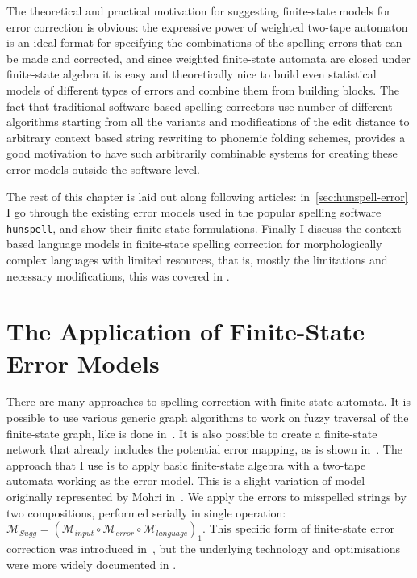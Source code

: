 \documentclass[officiallayout]{unihelcompling}
\begin{document}
The theoretical and practical motivation for suggesting finite-state models for
error correction is obvious: the expressive power of weighted two-tape 
automaton is an ideal format for specifying the combinations of the
spelling errors that can be made and corrected, and since weighted
finite-state automata are closed under finite-state algebra it is easy
and theoretically nice to build even statistical models of different types
of errors and combine them from building blocks. The fact that traditional
software based spelling correctors use number of different algorithms starting
from all the variants and modifications of the edit distance to arbitrary
context based string rewriting to phonemic folding schemes, provides a good
motivation to have such arbitrarily combinable systems for creating these
error models outside the software level.

The rest of this chapter is laid out along following articles: in~\ref{sec:hunspell-error} I go through the existing error models used in the
popular spelling software \texttt{hunspell}, and show their finite-state
formulations.  Finally I discuss the context-based language models in
finite-state spelling correction for morphologically complex languages with
limited resources, that is, mostly the limitations and necessary modifications,
this was covered in .

\section{The Application of Finite-State Error Models}

There are many approaches to spelling correction with finite-state automata.
It is possible to use various generic graph algorithms to work on fuzzy
traversal of the finite-state graph, like is done in~\citep{hulden2009fast}.  It
is also possible to create a finite-state network that already includes the
potential error mapping, as is shown in~\citep{schulz2002fast}. The approach
that I use is to apply basic finite-state algebra with a two-tape automata
working as the error model. This is a slight variation of model originally
represented by Mohri in~\citep{mohri2003edit}. We apply the errors to misspelled
strings by two compositions, performed serially in single operation:
$\mathcal{M}_{Sugg} = (\mathcal{M}_{input} \circ \mathcal{M}_{error} \circ
\mathcal{M}_{language})_1$.  This specific form of finite-state error
correction was introduced in~, but the underlying
technology and optimisations were more widely documented in
\citep{linden2011hfst}.
\end{document}
